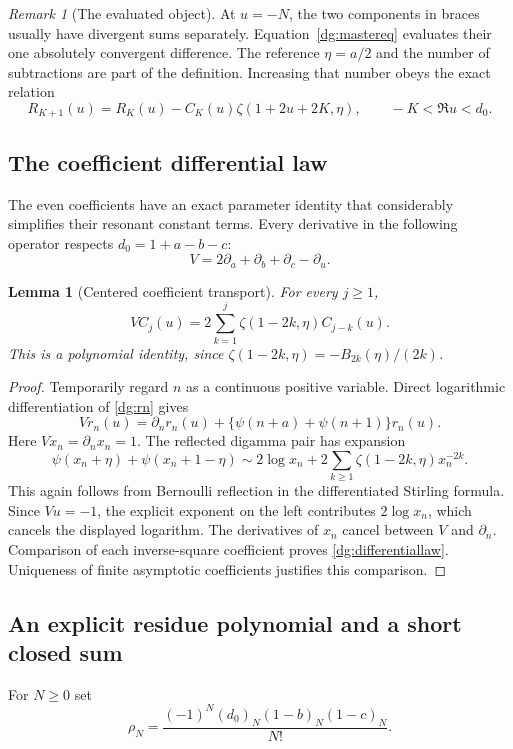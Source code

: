 \documentclass[11pt,a4paper]{article}
\numberwithin{equation}{section}
\newtheorem{lemma}[theorem]{Lemma}
\theoremstyle{definition}
\theoremstyle{remark}
\newtheorem{remark}[theorem]{Remark}
\begin{document}
\begin{remark}[The evaluated object]\label{dg:ordinary}
At $u=-N$, the two components in braces usually have divergent sums
separately. Equation~\eqref{dg:mastereq} evaluates their one absolutely
convergent difference. The reference $\eta=a/2$ and the number of
subtractions are part of the definition. Increasing that number obeys
the exact relation
\[
 R_{K+1}(u)=R_K(u)-C_K(u)\zeta(1+2u+2K,\eta),
 \qquad -K<\Re u<d_0.
\]
\end{remark}

\subsection{The coefficient differential law}
The even coefficients have an exact parameter identity that considerably
simplifies their resonant constant terms. Every derivative in the
following operator respects $d_0=1+a-b-c$:
\[
 V=2\partial_a+\partial_b+\partial_c-\partial_u.
\]

\begin{lemma}[Centered coefficient transport]\label{dg:differential}
For every $j\ge1$,
\begin{equation}\label{dg:differentiallaw}
 \boxed{VC_j(u)=2\sum_{k=1}^j
                      \zeta(1-2k,\eta)C_{j-k}(u).}
\end{equation}
This is a polynomial identity, since
$\zeta(1-2k,\eta)=-B_{2k}(\eta)/(2k)$.
\end{lemma}
\begin{proof}
Temporarily regard $n$ as a continuous positive variable. Direct
logarithmic differentiation of \eqref{dg:rn} gives
\begin{equation}\label{dg:termtransport}
 Vr_n(u)=\partial_n r_n(u)
                 +\{\psi(n+a)+\psi(n+1)\}r_n(u).
\end{equation}
Here $Vx_n=\partial_nx_n=1$. The reflected digamma pair has expansion
\[
 \psi(x_n+\eta)+\psi(x_n+1-\eta)
 \sim2\log x_n+2\sum_{k\ge1}\zeta(1-2k,\eta)x_n^{-2k}.
\]
This again follows from Bernoulli reflection in the differentiated
Stirling formula. Since $Vu=-1$, the explicit exponent on the left
contributes $2\log x_n$, which cancels the displayed logarithm.
The derivatives of $x_n$ cancel between $V$ and $\partial_n$.
Comparison of each inverse-square coefficient proves
\eqref{dg:differentiallaw}. Uniqueness of finite asymptotic
coefficients justifies this comparison.
\end{proof}

\subsection{An explicit residue polynomial and a short closed sum}
For $N\ge0$ set
\begin{equation}\label{dg:rho}
 \rho_N=\frac{(-1)^N(d_0)_N(1-b)_N(1-c)_N}{N!}.
\end{equation}
\end{document}
